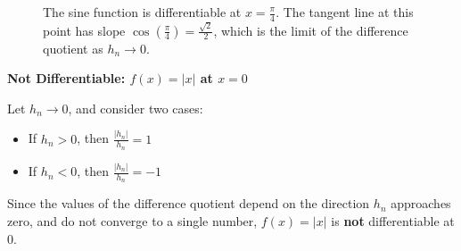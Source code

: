 \begin{figure}[H]
\centering
{}
\caption{
The sine function is differentiable at \( x = \frac{\pi}{4} \). The tangent line at this point has slope \( \cos\left(\frac{\pi}{4}\right) = \frac{\sqrt{2}}{2} \), which is the limit of the difference quotient as \( h_n \to 0 \).
}
\end{figure}
    
    
  

\textbf{Not Differentiable: \( f(x) = |x| \) at \( x = 0 \)}  

    Let \( h_n \to 0 \), and consider two cases:

    \begin{itemize}
        \item If \( h_n > 0 \), then \( \frac{|h_n|}{h_n} = 1 \)
        \item If \( h_n < 0 \), then \( \frac{|h_n|}{h_n} = -1 \)
    \end{itemize}

    Since the values of the difference quotient depend on the direction \( h_n \) approaches zero, and do not converge to a single number, \( f(x) = |x| \) is \textbf{not} differentiable at 0.




